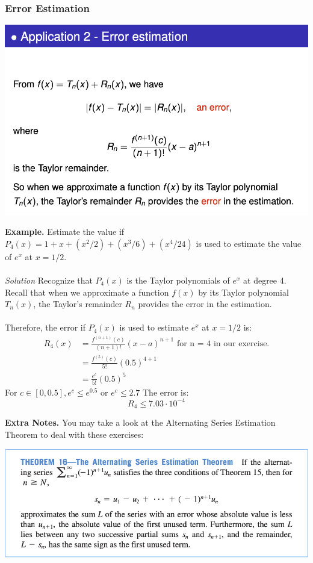 \documentclass{article}
\begin{document}
\subsubsection{Error Estimation}
\begin{center}
        \includegraphics[scale = 0.7]{application 2. error estimation.png}
\end{center}
\textbf{Example. } Estimate the value if $P_4(x) =  1 + x + (x^2/2) + (x^3/6) + (x^4/24)$ is used to estimate the value of $e^x$ at $x=1/2$. \\ \\
\textit{Solution} Recognize that $P_4(x)$ is the Taylor polynomials of $e^x$ at degree 4.  Recall that when we approximate a function $f(x)$ by its Taylor polynomial $T_n(x)$, the Taylor’s remainder $R_n$ provides the error in the estimation. \\ \\
Therefore, the error if $P_4(x)$ is used to estimate $e^x$ at $x=1/2$ is:
\begin{align*}
    R_4(x) &=  \frac{f^{(n+1)}(c)}{(n+1)!} (x-a)^{n+1} \text{ for n = 4 in our exercise.} \\
    &= \frac{f^{(5)}(c)}{5!} (0.5)^{4+1} \\
    &= \frac{e^c}{5!}(0.5)^5
\end{align*}
 For $c \in [0, 0.5], e^c \leq e^{0.5}$ or $e^c \leq 2.7$
 The error is: 
 $$ R_4 \leq 7.03 \cdot 10^{-4} $$

\textbf{Extra Notes.} You may take a look at the Alternating Series Estimation Theorem to deal with these exercises: 
\begin{center}
        \includegraphics[scale = 0.7]{additional theorem.png}
\end{center}
\end{document}
